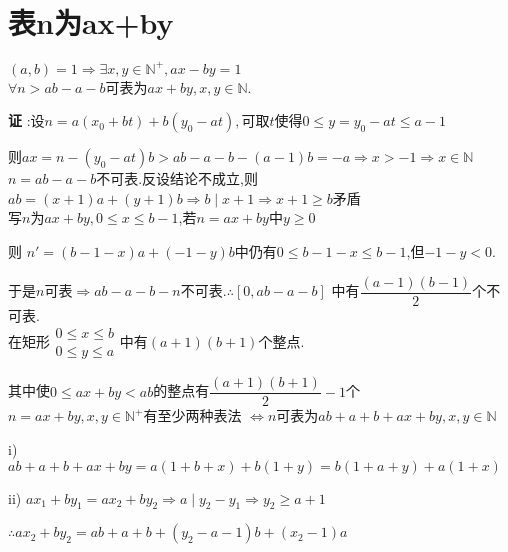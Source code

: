 \section{表n为ax+by}
$(a,b)=1\Rightarrow \exists x,y\in \mathbb{N}^+,ax-by=1$
\\

$ \forall n>ab-a-b$可表为$ ax+by,x,y\in \mathbb{N}$.

{\bf 证 }:设$ n=a(x_0+bt)+b(y_0-at),$可取$ t$使得$ 0 \le y =y_0-at\le a-1$

则$ ax=n-(y_0-at)b>ab-a-b-(a-1)b=-a\Rightarrow x>-1\Rightarrow x\in \mathbb{N}$
\\

$ n=ab-a-b$不可表.反设结论不成立,则
$ ab=(x+1)a+(y+1)b\Rightarrow b\mid x+1\Rightarrow x+1\ge b$矛盾
\\

写$ n$为$ ax+by,0\le x\le b-1$,若$ n=ax+by$中$ y\ge 0$

则 $ n'=(b-1-x)a+(-1-y)b$中仍有$ 0 \le b-1-x \le b-1$,但$ -1-y <0$.

于是$ n$可表$ \Rightarrow ab-a-b-n$不可表.$ \therefore [0,ab-a-b]$
中有$ \dfrac{(a-1)(b-1)}{2}$个不可表.
\\

在矩形$\begin{matrix} 0\le x\le b\\ 0\le y\le a \end{matrix} $中有$ (a+1)(b+1)$个整点.

其中使$ 0\le ax+by<ab$的整点有$ \dfrac{(a+1)(b+1)}{2} -1$个
\\

$ n=ax+by,x,y\in \mathbb{N^+}$有至少两种表法
$ \Leftrightarrow n$可表为$ ab+a+b+ax+by,x,y\in \mathbb{N}$

i) $ ab+a+b+ax+by=a(1+b+x)+b(1+y)=b(1+a+y)+a(1+x)$

ii) $ ax_1+by_1=ax_2+by_2\Rightarrow a\mid y_2-y_1\Rightarrow y_2\ge a+1$

$ \therefore ax_2+by_2=ab+a+b+(y_2-a-1)b+(x_2-1)a$
